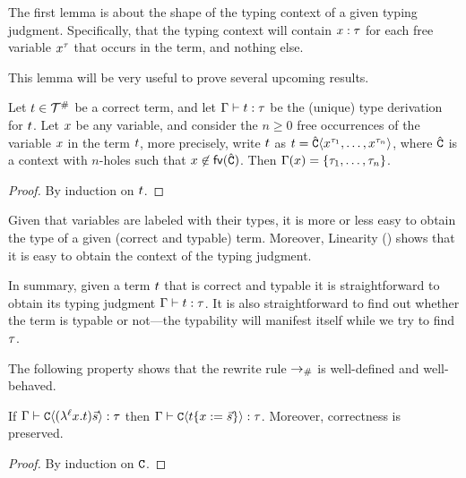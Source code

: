 
The first lemma is about the shape of the typing context of a given typing judgment.
Specifically, that the typing context will contain $x : \tau$ for each free variable
$x^\tau$ that occurs in the term, and nothing else.

This lemma will be very useful to prove several upcoming results.

\begin{lemma}[Linearity]
Let $t \in \mathcal{T}^{\mathtt{\#}}$ be a correct term,
and let $\Gamma \vdash t : \tau$ be the (unique) type derivation for $t$.
Let $x$ be any variable,
and consider the $n \geq 0$ free occurrences of the variable $x$ in the term $t$,
more precisely, write $t$ as $t = \hat{\mathtt{C}}\langle x^{\tau_1},\hdots,x^{\tau_n}\rangle$,
where $\hat{\mathtt{C}}$ is a context with $n$-holes such that $x \not\in \mathsf{fv}({\hat{\mathtt{C}}})$.
Then $\Gamma(x) = \{\tau_1,\hdots,\tau_n\}$.
\end{lemma}
\begin{proof}
By induction on $t$.
\end{proof}


\begin{remark}
  Given that variables are labeled with their types, it is more or less easy to obtain
  the type of a given (correct and typable) term.
  Moreover, Linearity () shows that it is easy to obtain the context of the typing judgment.

  In summary, given a term $t$ that is correct and typable
  it is straightforward to obtain its typing judgment
  $\Gamma \vdash t : \tau$.
  It is also straightforward to find out whether the term is typable or not---the
  typability will manifest itself while we try to find $\tau$.
\end{remark}



The following property shows that the rewrite rule $\mathrel{\to_{\mathtt{\#}}}$ is well-defined and well-behaved.



\begin{lemma}
If $\Gamma \vdash \mathtt{C}\langle(\lambda^{\ell} x. t) \vec{s}\rangle : \tau$
then $\Gamma \vdash \mathtt{C}\langle t\{x := \vec{s}\}\rangle : \tau$.
Moreover, correctness is preserved.
\end{lemma}
\begin{proof}
 By induction on $\mathtt{C}$.
\end{proof}

